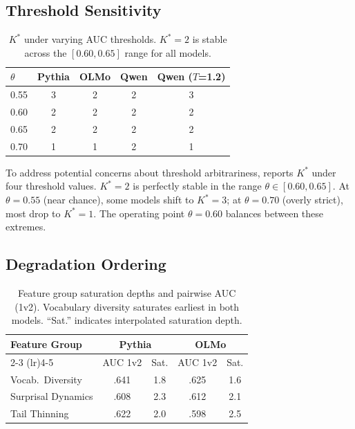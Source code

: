 \documentclass[11pt,a4paper]{article}
\begin{document}
\subsection{Threshold Sensitivity}
\label{sec:threshold_sensitivity}

\begin{table}[t]
\centering
\small
\begin{tabular}{lcccc}
\toprule
$\theta$ & Pythia & OLMo & Qwen & Qwen ($T$=1.2) \\
\midrule
0.55 & 3 & 2 & 2 & 3 \\
0.60 & 2 & 2 & 2 & 2 \\
0.65 & 2 & 2 & 2 & 2 \\
0.70 & 1 & 1 & 2 & 1 \\
\bottomrule
\end{tabular}
\caption{$K^*$ under varying AUC thresholds. $K^*=2$ is stable across the $[0.60, 0.65]$ range for all models.}
\label{tab:threshold}
\end{table}

To address potential concerns about threshold arbitrariness,  reports $K^*$ under four threshold values. $K^*=2$ is perfectly stable in the range $\theta \in [0.60, 0.65]$. At $\theta=0.55$ (near chance), some models shift to $K^*=3$; at $\theta=0.70$ (overly strict), most drop to $K^*=1$. The operating point $\theta=0.60$ balances between these extremes.

\subsection{Degradation Ordering}
\label{sec:ordering}

\begin{table}[t]
\centering
\small
\begin{tabular}{lcccc}
\toprule
\textbf{Feature Group} & \multicolumn{2}{c}{\textbf{Pythia}} & \multicolumn{2}{c}{\textbf{OLMo}} \\
\cmidrule(lr){2-3} \cmidrule(lr){4-5}
 & AUC 1v2 & Sat. & AUC 1v2 & Sat. \\
\midrule
Vocab.\ Diversity & .641 & 1.8 & .625 & 1.6 \\
Surprisal Dynamics & .608 & 2.3 & .612 & 2.1 \\
Tail Thinning & .622 & 2.0 & .598 & 2.5 \\
\bottomrule
\end{tabular}
\caption{Feature group saturation depths and pairwise AUC (1v2). Vocabulary diversity saturates earliest in both models. ``Sat.'' indicates interpolated saturation depth.}
\label{tab:degradation}
\end{table}
\end{document}
